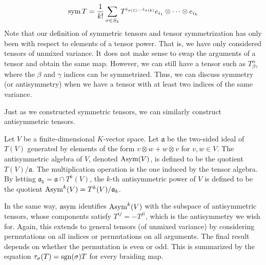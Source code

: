\documentclass[a4paper,12pt]{article}
\begin{document}
\begin{equation}
    \operatorname{sym}{T} = \frac{1}{k!} \sum_{\sigma \in S_k} T^{i_{\sigma(1)} \ldots i_{\sigma(k)}} e_{i_1} \otimes \cdots \otimes e_{i_k}
\end{equation}
Note that our definition of symmetric tensors and tensor symmetrization has only been with respect to elements of a tensor power.
That is, we have only considered tensors of unmixed variance.
It does not make sense to swap the arguments of a tensor and obtain the same map.
However, we can still have a tensor such as $T^\alpha_{\beta \gamma}$ where the $\beta$ and $\gamma$ indices can be symmetrized.
Thus, we can discuss symmetry (or antisymmetry) when we have a tensor with at least two indices of the same variance.

Just as we constructed symmetric tensors, we can similarly construct antisymmetric tensors.
\begin{definition}\label{def:antisymmetric_algebra}
    Let $V$ be a finite-dimensional $K$-vector space.
    Let $\mathfrak{a}$ be the two-sided ideal of $T(V)$ generated by elements of the form $v \otimes w + w \otimes v$ for $v, w \in V$.
    The antisymmetric algebra of $V$, denoted $\operatorname{Asym}(V)$, is defined to be the quotient $T(V) / \mathfrak{a}$.
    The multiplication operation is the one induced by the tensor algebra.
    By letting $\mathfrak{a}_k = \mathfrak{a} \cap T^k(V)$, the $k$-th antisymmetric power of $V$ is defined to be the quotient $\operatorname{Asym}^k(V) = T^k(V) / \mathfrak{a}_k$.
\end{definition}
In the same way, $\operatorname{asym}$ identifies $\operatorname{Asym}^k(V)$ with the subspace of antisymmetric tensors, whose components satisfy $T^{ij} = -T^{ji}$, which is the antisymmetry we wish for.
Again, this extends to general tensors (of unmixed variance) by considering permutations on all indices or permutations on all arguments.
The final result depends on whether the permutation is even or odd.
This is summarized by the equation $\tau_\sigma (T) = \operatorname{sgn}(\sigma) T$ for every braiding map.
\end{document}
